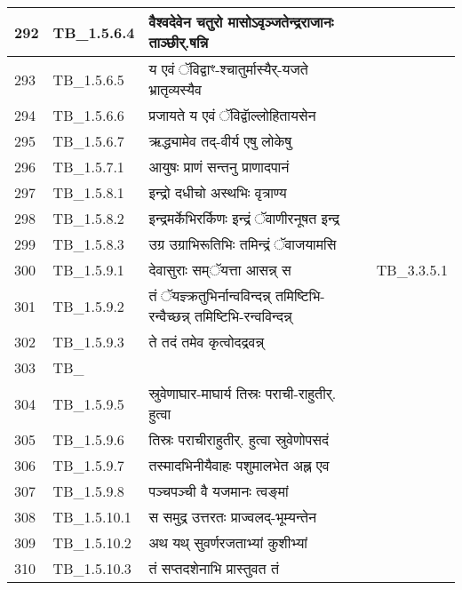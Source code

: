\documentclass[17pt]{extarticle}
\begin{document}
\begin{longtable}{||p{0.4in}||p{0.9in}||p{4.0in}||p{0.9in}||}
        \hline
            292 & TB\_1.5.6.4 & वैश्वदेवेन चतुरो मासोऽवृञ्जतेन्द्रराजानः ताञ्छीर्.षन्नि &      \\
        \hline
            293 & TB\_1.5.6.5 & य एवं ॅविद्वाꣳ{-}श्चातुर्मास्यैर्{-}यजते भ्रातृव्यस्यैव &      \\
        \hline
            294 & TB\_1.5.6.6 & प्रजायते य एवं ॅविद्वाॅल्लोहितायसेन &      \\
        \hline
            295 & TB\_1.5.6.7 & ऋद्ध्यामेव तद्{-}वीर्य एषु लोकेषु &      \\
        \hline
            296 & TB\_1.5.7.1 & आयुषः प्राणं सन्तनु प्राणादपानं &      \\
        \hline
            297 & TB\_1.5.8.1 & इन्द्रो दधीचो अस्थभिः वृत्राण्य &      \\
        \hline
            298 & TB\_1.5.8.2 & इन्द्रमर्केभिरर्किणः इन्द्रं ॅवाणीरनूषत इन्द्र &      \\
        \hline
            299 & TB\_1.5.8.3 & उग्र उग्राभिरूतिभिः तमिन्द्रं ॅवाजयामसि &      \\
        \hline
            300 & TB\_1.5.9.1 & देवासुराः सम्ॅयत्ता आसन्न् स &  TB\_3.3.5.1       \\
        \hline
            301 & TB\_1.5.9.2 & तं ॅयज्ञ्क्रतुभिर्नान्वविन्दन्न् तमिष्टिभि{-}रन्वैच्छन्न् तमिष्टिभि{-}रन्वविन्दन्न् &      \\
        \hline
            302 & TB\_1.5.9.3 & ते तदं तमेव कृत्वोदद्रवन्न् &      \\
        \hline
            303 & TB\_ &  &           \\
        \hline
            304 & TB\_1.5.9.5 & स्रुवेणाघार{-}माघार्य तिस्रः पराची{-}राहुतीर्. हुत्वा &      \\
        \hline
            305 & TB\_1.5.9.6 & तिस्रः पराचीराहुतीर्. हुत्वा स्रुवेणोपसदं &      \\
        \hline
            306 & TB\_1.5.9.7 & तस्मादभिनीयैवाहः पशुमालभेत अह्न एव &      \\
        \hline
            307 & TB\_1.5.9.8 & पञ्चपञ्ची वै यजमानः त्वङ्मां &      \\
        \hline
            308 & TB\_1.5.10.1 & स समुद्र उत्तरतः प्राज्वलद्{-}भूम्यन्तेन &      \\
        \hline
            309 & TB\_1.5.10.2 & अथ यथ् सुवर्णरजताभ्यां कुशीभ्यां &      \\
        \hline
            310 & TB\_1.5.10.3 & तं सप्तदशेनाभि प्रास्तुवत तं &      \\
        \hline

\end{longtable}
\end{document}
